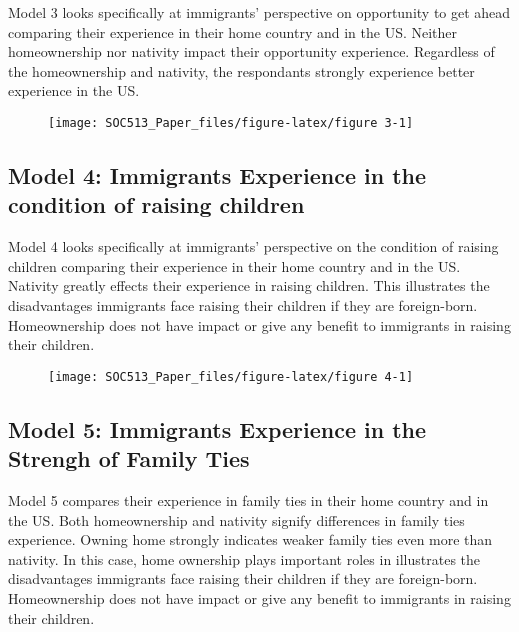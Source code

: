 \documentclass[11pt,]{article}
\begin{document}
Model 3 looks specifically at immigrants' perspective on opportunity to
get ahead comparing their experience in their home country and in the
US. Neither homeownership nor nativity impact their opportunity
experience. Regardless of the homeownership and nativity, the
respondants strongly experience better experience in the US.

\begin{figure}

{\centering \texttt{[image: SOC513\_Paper\_files/figure-latex/figure 3-1]} 

}

\end{figure}

\hypertarget{model-4-immigrants-experience-in-the-condition-of-raising-children}{%
\subsection{Model 4: Immigrants Experience in the condition of raising
children}\label{model-4-immigrants-experience-in-the-condition-of-raising-children}}

Model 4 looks specifically at immigrants' perspective on the condition
of raising children comparing their experience in their home country and
in the US. Nativity greatly effects their experience in raising
children. This illustrates the disadvantages immigrants face raising
their children if they are foreign-born. Homeownership does not have
impact or give any benefit to immigrants in raising their children.

\begin{figure}

{\centering \texttt{[image: SOC513\_Paper\_files/figure-latex/figure 4-1]} 

}

\end{figure}

\hypertarget{model-5-immigrants-experience-in-the-strengh-of-family-ties}{%
\subsection{Model 5: Immigrants Experience in the Strengh of Family
Ties}\label{model-5-immigrants-experience-in-the-strengh-of-family-ties}}

Model 5 compares their experience in family ties in their home country
and in the US. Both homeownership and nativity signify differences in
family ties experience. Owning home strongly indicates weaker family
ties even more than nativity. In this case, home ownership plays
important roles in illustrates the disadvantages immigrants face raising
their children if they are foreign-born. Homeownership does not have
impact or give any benefit to immigrants in raising their children.
\end{document}
